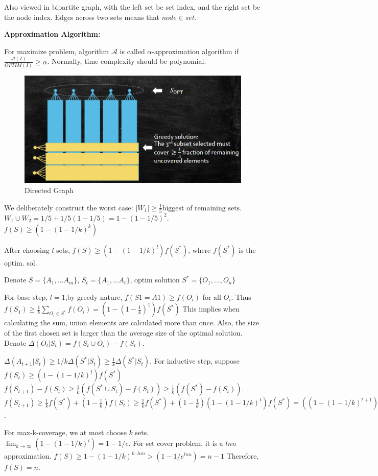 Also viewed in bipartite graph, with the left set be set index, and the right set be the node index. Edges across two sets means that $node \in set$.
\begin{remark}
\textbf{Approximation Algorithm:}

For maximize problem, algorithm $\mathcal{A} $ is called $\alpha$-approximation algorithm if $\frac{\mathcal{A}(I)}{OPTIM(I)}\geq \alpha$. Normally, time complexity should be polynomial.
\end{remark}

\begin{figure}
	\centering
    \includegraphics[width=0.8\linewidth]{Notes/fig/setcover.png}
    \caption{Directed Graph}
    \label{fig:setcover}
\end{figure}

We deliberately construct the worst case:
$|W_1|\geq \frac{1}{5}\text{biggest of remaining sets}$.
$W_1\cup W_2=1/5+1/5(1-1/5)=1-(1-1/5)^2$.
$f(S)\geq (1-(1-1/k)^k)$
\begin{lemma}
After choosing $l$ sets, $f(S)\geq (1-(1-1/k)^l)f(S^*)$, where $f(S^*)$ is the optim. sol. 
\end{lemma}
\begin{prf}
    Denote $S=\{A_1,\ldots A_m\}$, $S_t=\{A_1,\ldots A_t\}$, optim solution $S^*=\{O_1,\ldots, O_n\}$

    For base step, $l=1$,by greedy nature, $f(S1={A1})\geq f({O_i})$ for all $O_i$.
    Thus $f(S_1)\geq \frac{1}{k}\sum_{O_i \in S^*}f({O_i})=(1-(1-\frac{1}{k})^1)f(S^*)$ This implies when calculating the sum, union elements are calculated more than once.
    Also, the size of the first chosen set is larger than the average size of the optimal solution.
    Denote $\Delta(O_t|S_t)=f(S_t\cup {O_i})-f(S_t)$.

    $\Delta(A_{t+1}|S_t)\geq1/k\Delta(S^*|S_t)\geq \frac{1}{k}\Delta(S^*|S_t)$.
    For inductive step, suppose $f(S_t)\geq (1-(1-1/k)^t)f(S^*) $ 
    $f(S_{t+1})-f(S_t)\geq \frac{1}{k}(f(S^*\cup S_t)-f(S_t))\geq \frac{1}{k}(f(S^*)-f(S_t))$.
    $f(S_{t+1})\geq \frac{1}{k}f(S^*) + (1-\frac{1}{k})f(S_t)
    \geq \frac{1}{k}f(S^*) + (1-\frac{1}{k})(1-(1-1/k)^t)f(S^*)=((1-(1-1/k)^{t+1})f(S^*))$.
\end{prf}
For max-k-coverage, we at most choose $k$ sets.
$\lim_{k\rightarrow \infty}(1-(1-1/k)^l) =1-1/e$.
For set cover problem, it is a $ln n$ approximation.
$f(S)\geq 1-(1-1/k)^{k\cdot ln n}>(1-1/e^{ln n})=n-1$ Therefore, $f(S)=n$.

